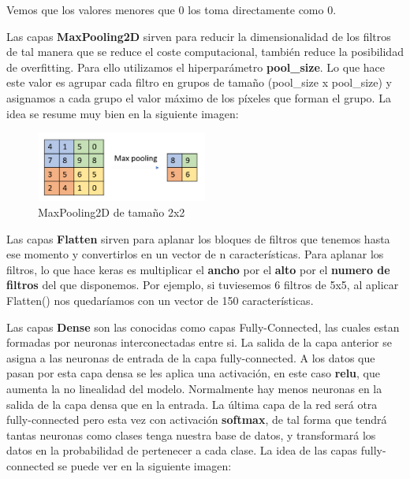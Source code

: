 \vspace{5 mm}

Vemos que los valores menores que 0 los toma directamente como 0.

\newpage

Las capas \textbf{MaxPooling2D} sirven para reducir la dimensionalidad de los filtros de tal manera que se reduce el coste computacional, también reduce la posibilidad de overfitting. Para ello utilizamos el hiperparámetro \textbf{pool\_size}. Lo que hace este valor es agrupar cada filtro en grupos de tamaño (pool\_size x pool\_size) y asignamos a cada grupo el valor máximo de los píxeles que forman el grupo. La idea se resume muy bien en la siguiente imagen:

\vspace{5 mm}

\begin{figure}[H]
\centering
  \includegraphics[width=0.5\textwidth]{Imagenes/pooling.jpg}
   \caption{MaxPooling2D de tamaño 2x2}
\end{figure}

\vspace{5 mm}

Las capas \textbf{Flatten} sirven para aplanar los bloques de filtros que tenemos hasta ese momento y convertirlos en un vector de n características. Para aplanar los filtros, lo que hace keras es multiplicar el \textbf{ancho} por el \textbf{alto} por el \textbf{numero de filtros} del que disponemos. Por ejemplo, si tuviesemos 6 filtros de 5x5, al aplicar Flatten() nos quedaríamos con un vector de 150 características.

\vspace{5 mm}

Las capas \textbf{Dense} son las conocidas como capas Fully-Connected, las cuales estan formadas por neuronas interconectadas entre si. La salida de la capa anterior se asigna a las neuronas de entrada de la capa fully-connected. A los datos que pasan por esta capa densa se les aplica una activación, en este caso \textbf{relu}, que aumenta la no linealidad del modelo. Normalmente hay menos neuronas en la salida de la capa densa que en la entrada.
La última capa de la red será otra fully-connected pero esta vez con activación \textbf{softmax}, de tal forma que tendrá tantas neuronas como clases tenga nuestra base de datos, y transformará los datos en la probabilidad de pertenecer a cada clase. La idea de las capas fully-connected se puede ver en la siguiente imagen:

